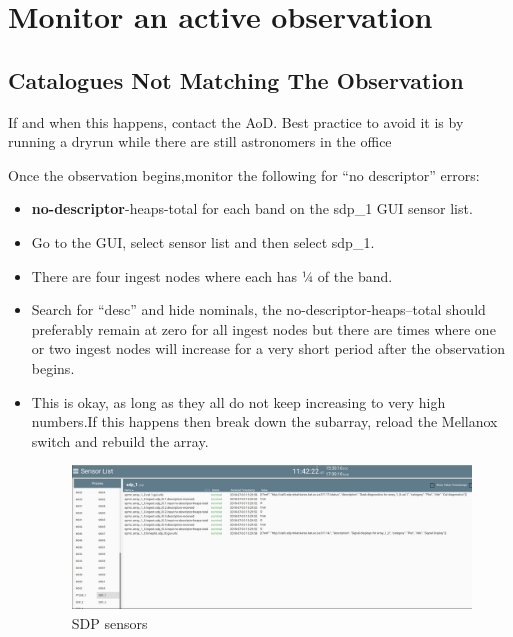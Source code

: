          




\section{ Monitor an active observation}
\subsection{Catalogues Not Matching The Observation}
If and when this happens, contact the AoD. Best practice to avoid it is by running a dryrun while there are still astronomers in the office

Once the observation begins,monitor the following for “no descriptor” errors:
\begin{itemize}

\item \textbf{no-descriptor}-heaps-total for each band on the sdp\_1 GUI sensor list. 
\item Go to the GUI, select sensor list and then select sdp\_1.
\item There are four ingest nodes where each has ¼ of the band.
\item Search for “desc” and hide nominals, the no-descriptor-heaps--total should preferably remain at zero for all ingest nodes but there are times where one or two ingest nodes will increase for a very short period after the observation begins.
\item This is okay, as long as they all do not keep increasing to very high numbers.If this happens then break down the subarray, reload the Mellanox switch and rebuild the array.
	


\begin{figure}[!thb]
	\centering
	\includegraphics[scale=0.26]{Chapters/images/image129.png}
	
	\caption{SDP sensors}
	\label{fig:image129}
\end{figure}



\end{itemize}
